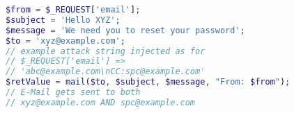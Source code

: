 \begin{lstlisting}[language=PHP,caption={PHP program with e-mail
      header injection vulnerability.},label={code:phpemi}, float]
$from = $_REQUEST['email'];
$subject = 'Hello XYZ';
$message = 'We need you to reset your password';
$to = 'xyz@example.com';
// example attack string injected as for
// $_REQUEST['email'] => 
// 'abc@example.com\nCC:spc@example.com'
$retValue = mail($to, $subject, $message, "From: $from");
// E-Mail gets sent to both 
// xyz@example.com AND spc@example.com
\end{lstlisting}
